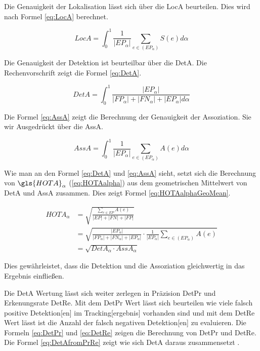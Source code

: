 
Die Genauigkeit der \gls{Lokalisation} lässt sich über die \gls{LocA} beurteilen. Dies wird nach Formel \ref{eq:LocA} berechnet.

\begin{equation}
    \label{eq:LocA}
    LocA = \int_{0}^{1} \frac{1}{|EP_{\alpha}|} \sum_{e \in (EP_{\alpha})} S(e) d\alpha
\end{equation}

Die Genauigkeit der \gls{Detektion} ist beurteilbar über die \gls{DetA}. Die Rechenvorschrift zeigt die Formel \ref{eq:DetA}.

\begin{equation}
    \label{eq:DetA}
    DetA = \int_{0}^{1} \frac{|EP_{\alpha}|}{|FP_{\alpha}| + |FN_{\alpha}| + |EP_{\alpha}| d\alpha}
\end{equation}

Die Formel \ref{eq:AssA} zeigt die Berechnung der Genauigkeit der \gls{Assoziation}. Sie wir Ausgedrückt über die \gls{AssA}. 

\begin{equation}
    \label{eq:AssA}
    AssA = \int_{0}^{1} \frac{1}{|EP_{\alpha}|} \sum_{e \in (EP_{\alpha})} A(e) d\alpha
\end{equation}

Wie man an den Formel \ref{eq:DetA} und \ref{eq:AssA} sieht, setzt sich die Berechnung von \(\gls{HOTA}_{\alpha}\) (\ref{eq:HOTAalpha}) aus dem geometrischen Mittelwert von \gls{DetA} und \gls{AssA} zusammen. Dies zeigt Formel \ref{eq:HOTAalphaGeoMean}.

\begin{equation}
\begin{split}
    \label{eq:HOTAalphaGeoMean}
    HOTA_{\alpha} &= \sqrt{\frac{\sum_{e \in EP} A(e)}{|EP| + |FN| + |FP|}} \\ 
    &= \sqrt{\frac{|EP_{\alpha}|}{|FP_{\alpha}| + |FN_{\alpha}| + |EP_{\alpha}|} \cdot \frac{1}{|EP_{\alpha}|} \sum_{e \in (EP_{\alpha})} A(e)} \\ 
    &= \sqrt{DetA_{\alpha} \cdot AssA_{\alpha}}
\end{split}
\end{equation}

Dies gewährleistet, dass die \gls{Detektion} und die \gls{Assoziation} gleichwertig in das Ergebnis einfließen. \par

Die \gls{DetA} Wertung lässt sich weiter zerlegen in Präzision \gls{DetPr} und Erkenungsrate \gls{DetRe}. Mit dem \gls{DetPr} Wert lässt sich beurteilen wie viele falsch positive \gls{Detektion}[en] im \gls{Tracking}[ergebnis] vorhanden sind und mit dem \gls{DetRe} Wert lässt ist die Anzahl der falsch negativen \gls{Detektion}[en] zu evaluieren. Die Formeln \ref{eq:DetPr} und \ref{eq:DetRe} zeigen die Berechnung von \gls{DetPr} und \gls{DetRe}. Die Formel \ref{eq:DetAfromPrRe} zeigt wie sich \gls{DetA} daraus zusammensetzt \cite{HOTA}.

